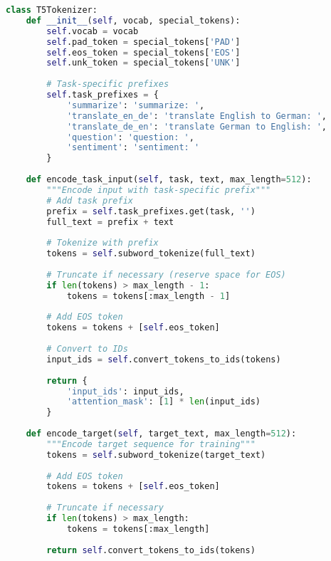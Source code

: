 \begin{lstlisting}[language=Python, caption=T5-style task prefix insertion]
class T5Tokenizer:
    def __init__(self, vocab, special_tokens):
        self.vocab = vocab
        self.pad_token = special_tokens['PAD']
        self.eos_token = special_tokens['EOS']
        self.unk_token = special_tokens['UNK']
        
        # Task-specific prefixes
        self.task_prefixes = {
            'summarize': 'summarize: ',
            'translate_en_de': 'translate English to German: ',
            'translate_de_en': 'translate German to English: ',
            'question': 'question: ',
            'sentiment': 'sentiment: '
        }
    
    def encode_task_input(self, task, text, max_length=512):
        """Encode input with task-specific prefix"""
        # Add task prefix
        prefix = self.task_prefixes.get(task, '')
        full_text = prefix + text
        
        # Tokenize with prefix
        tokens = self.subword_tokenize(full_text)
        
        # Truncate if necessary (reserve space for EOS)
        if len(tokens) > max_length - 1:
            tokens = tokens[:max_length - 1]
        
        # Add EOS token
        tokens = tokens + [self.eos_token]
        
        # Convert to IDs
        input_ids = self.convert_tokens_to_ids(tokens)
        
        return {
            'input_ids': input_ids,
            'attention_mask': [1] * len(input_ids)
        }
    
    def encode_target(self, target_text, max_length=512):
        """Encode target sequence for training"""
        tokens = self.subword_tokenize(target_text)
        
        # Add EOS token
        tokens = tokens + [self.eos_token]
        
        # Truncate if necessary
        if len(tokens) > max_length:
            tokens = tokens[:max_length]
            
        return self.convert_tokens_to_ids(tokens)
\end{lstlisting}
\begin{comment}
Feedback: The code examples for BERT, GPT, and T5 are great. However, the text doesn't explain the *reasoning* behind their different approaches. Before diving into the code, it would be beneficial to have a short paragraph explaining the trade-offs. For example: "BERT's `[CLS]...[SEP]` structure is rigid but powerful for sentence-pair tasks. GPT's minimal `[BOS]...[EOS]` is designed for flexible, open-ended generation. T5's text-based prefixes are a clever way to frame every task as a text-to-text problem, allowing a single model to be multitask without architectural changes."
\end{comment}

